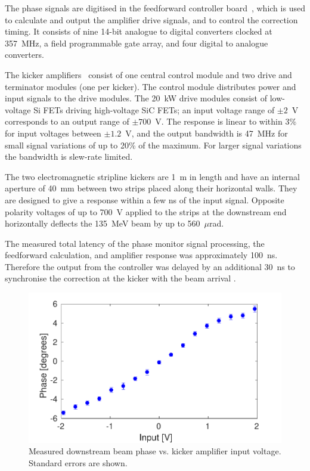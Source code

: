\documentclass[%
 reprint,
 superscriptaddress,
 amsmath,
 amssymb,
 prl,
]{revtex4-1}
\begin{document}
The phase signals are digitised  in the feedforward controller
board~\cite{RobertsThesis}, which is used to calculate and output the amplifier 
drive signals, and to  control the correction timing. It consists of nine 
14-bit analogue to digital converters clocked at 357~MHz, a field programmable 
gate array, and four digital to analogue converters. 

The kicker amplifiers~\cite{RobertsThesis} consist of one central control 
module and two drive and terminator modules (one per kicker). The control 
module distributes power and input signals to the 
drive modules. The 20~kW drive modules consist of low-voltage Si FETs driving 
high-voltage SiC FETs; an input voltage range of \(\pm2\)~V corresponds to an 
output range of \(\pm700\)~V. The response is linear to within 3\% for input 
voltages between \(\pm1.2\)~V, and the output bandwidth is 47~MHz for small 
signal variations of up to 20\% of the maximum. For larger signal variations 
the bandwidth is slew-rate limited.

The two electromagnetic stripline kickers \cite{kickerIPAC11} are 1~m in length 
and have an internal aperture of 40~mm between two strips placed along their 
horizontal walls. They are designed to give a response within a few ns of the 
input signal.
Opposite polarity voltages of up to 700~V applied to the 
strips at the downstream end horizontally deflects the 135~MeV 
beam by up to 560~\(\mu\)rad.

The measured total latency of the phase monitor signal processing, the 
feedforward calculation, and amplifier response was approximately 100~ns. 
Therefore the output from the controller was delayed by an additional 30~ns to 
synchronise the correction at the kicker with the beam arrival 
\cite{RobertsThesis}.

\begin{figure}
	\includegraphics[width=\columnwidth]{fig3}
	\caption{\label{fig:corrRange}Measured downstream beam phase vs. kicker 
	amplifier input voltage. Standard errors are shown.}
\end{figure}
\end{document}
